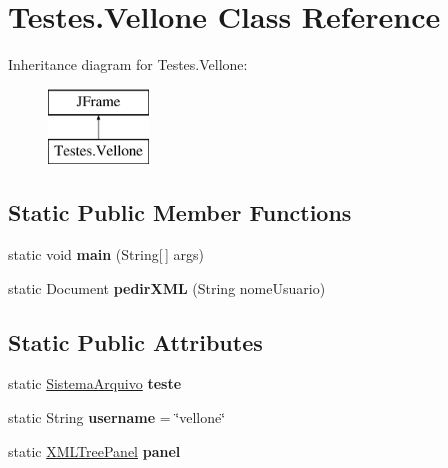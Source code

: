 \hypertarget{class_testes_1_1_vellone}{\section{Testes.\+Vellone Class Reference}
\label{class_testes_1_1_vellone}
}
Inheritance diagram for Testes.\+Vellone\+:\begin{figure}[H]
\begin{center}
\leavevmode
\includegraphics[height=2.000000cm]{class_testes_1_1_vellone}
\end{center}
\end{figure}
\subsection*{Static Public Member Functions}
\begin{DoxyCompactItemize}
\item 
\hypertarget{class_testes_1_1_vellone_a56452800dee4d1d21e6f25565e075201}{static void {\bfseries main} (String\mbox{[}$\,$\mbox{]} args)}\label{class_testes_1_1_vellone_a56452800dee4d1d21e6f25565e075201}

\item 
\hypertarget{class_testes_1_1_vellone_a5011c3ed8cc997410325dbf43b4f429e}{static Document {\bfseries pedir\+X\+M\+L} (String nome\+Usuario)}\label{class_testes_1_1_vellone_a5011c3ed8cc997410325dbf43b4f429e}

\end{DoxyCompactItemize}
\subsection*{Static Public Attributes}
\begin{DoxyCompactItemize}
\item 
\hypertarget{class_testes_1_1_vellone_a0cf37bfea87c820392cbfbaa30854cd3}{static \hyperlink{classservidor_1_1_sistema_arquivo}{Sistema\+Arquivo} {\bfseries teste}}\label{class_testes_1_1_vellone_a0cf37bfea87c820392cbfbaa30854cd3}

\item 
\hypertarget{class_testes_1_1_vellone_a76e1c3aef7cd74444144304ebd41bc5d}{static String {\bfseries username} = \char`\"{}vellone\char`\"{}}\label{class_testes_1_1_vellone_a76e1c3aef7cd74444144304ebd41bc5d}

\item 
\hypertarget{class_testes_1_1_vellone_a6f80c8b7ae8106d2f3ca5c042e55d141}{static \hyperlink{classjtree_1_1_x_m_l_tree_panel}{X\+M\+L\+Tree\+Panel} {\bfseries panel}}\label{class_testes_1_1_vellone_a6f80c8b7ae8106d2f3ca5c042e55d141}

\end{DoxyCompactItemize}


